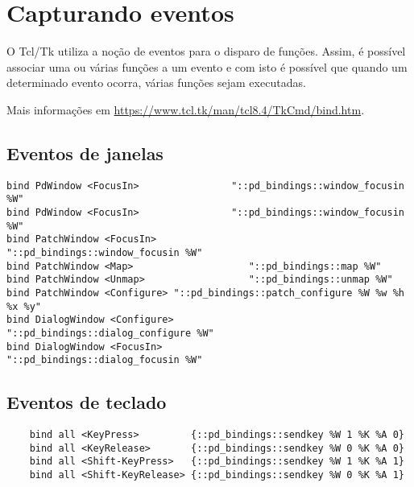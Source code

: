 \chapter{Capturando eventos}


O Tcl/Tk utiliza a noção de eventos para o disparo de funções.
Assim, é possível associar uma ou várias funções a um evento e com isto é
possível que quando um determinado evento ocorra, várias funções sejam
executadas.

Mais informações em \url{https://www.tcl.tk/man/tcl8.4/TkCmd/bind.htm}.

\section{Eventos de janelas}


\begin{lstlisting}
bind PdWindow <FocusIn>                "::pd_bindings::window_focusin %W"
bind PdWindow <FocusIn>                "::pd_bindings::window_focusin %W"
bind PatchWindow <FocusIn>                "::pd_bindings::window_focusin %W"
bind PatchWindow <Map>                    "::pd_bindings::map %W"
bind PatchWindow <Unmap>                  "::pd_bindings::unmap %W"
bind PatchWindow <Configure> "::pd_bindings::patch_configure %W %w %h %x %y"
bind DialogWindow <Configure>              "::pd_bindings::dialog_configure %W"
bind DialogWindow <FocusIn>                "::pd_bindings::dialog_focusin %W"
\end{lstlisting}


\section{Eventos de teclado}

\begin{lstlisting}
    bind all <KeyPress>         {::pd_bindings::sendkey %W 1 %K %A 0}
    bind all <KeyRelease>       {::pd_bindings::sendkey %W 0 %K %A 0}
    bind all <Shift-KeyPress>   {::pd_bindings::sendkey %W 1 %K %A 1}
    bind all <Shift-KeyRelease> {::pd_bindings::sendkey %W 0 %K %A 1}
\end{lstlisting}


